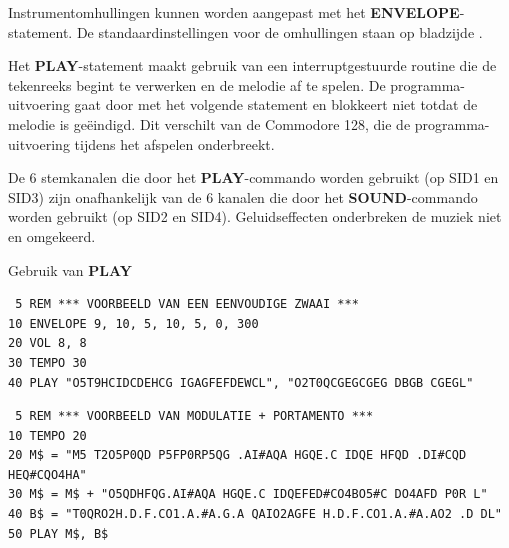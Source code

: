 \begin{description}[leftmargin=2cm,style=nextline]
                  Instrumentomhullingen kunnen worden aangepast met het {\bf ENVELOPE}-statement. De standaardinstellingen voor de omhullingen staan op bladzijde \pageref{envelopetable}.

\item [Retourneert:]  Het {\bf PLAY}-statement maakt gebruik van een interruptgestuurde routine die de tekenreeks begint te verwerken en de melodie af te spelen. De programma-uitvoering gaat door met het volgende statement en blokkeert niet totdat de melodie is geëindigd. Dit verschilt van de Commodore 128, die de programma-uitvoering tijdens het afspelen onderbreekt.

                  De 6 stemkanalen die door het {\bf PLAY}-commando worden gebruikt (op SID1 en SID3) zijn onafhankelijk van de 6 kanalen die door het {\bf SOUND}-commando worden gebruikt (op SID2 en SID4). Geluidseffecten onderbreken de muziek niet en omgekeerd.

\item [Voorbeelden:] Gebruik van {\bf PLAY}

\begin{tcolorbox}[colback=black,coltext=white]
\verbatimfont{\codefont}
\begin{verbatim}
 5 REM *** VOORBEELD VAN EEN EENVOUDIGE ZWAAI ***
10 ENVELOPE 9, 10, 5, 10, 5, 0, 300
20 VOL 8, 8
30 TEMPO 30
40 PLAY "O5T9HCIDCDEHCG IGAGFEFDEWCL", "O2T0QCGEGCGEG DBGB CGEGL"
\end{verbatim}
\end{tcolorbox}

\begin{tcolorbox}[colback=black,coltext=white]
\verbatimfont{\codefont}
\begin{verbatim}
 5 REM *** VOORBEELD VAN MODULATIE + PORTAMENTO ***
10 TEMPO 20
20 M$ = "M5 T2O5P0QD P5FP0RP5QG .AI#AQA HGQE.C IDQE HFQD .DI#CQD HEQ#CQO4HA"
30 M$ = M$ + "O5QDHFQG.AI#AQA HGQE.C IDQEFED#CO4BO5#C DO4AFD P0R L"
40 B$ = "T0QRO2H.D.F.CO1.A.#A.G.A QAIO2AGFE H.D.F.CO1.A.#A.AO2 .D DL"
50 PLAY M$, B$
\end{verbatim}
\end{tcolorbox}
\end{description}


\newpage
